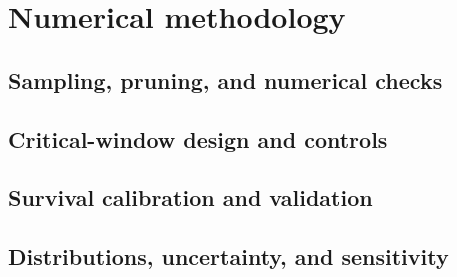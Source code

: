 \section{Numerical methodology}
\label{sec:numerical-methodology}

\subsection{Sampling, pruning, and numerical checks}
\label{sec:sampling-and-verification}

\subsection{Critical-window design and controls}
\label{sec:finite-size-design}

\subsection{Survival calibration and validation}
\label{sec:calibration-and-validation}

\subsection{Distributions, uncertainty, and sensitivity}
\label{sec:distributional-analysis}

\par\allowbreak
